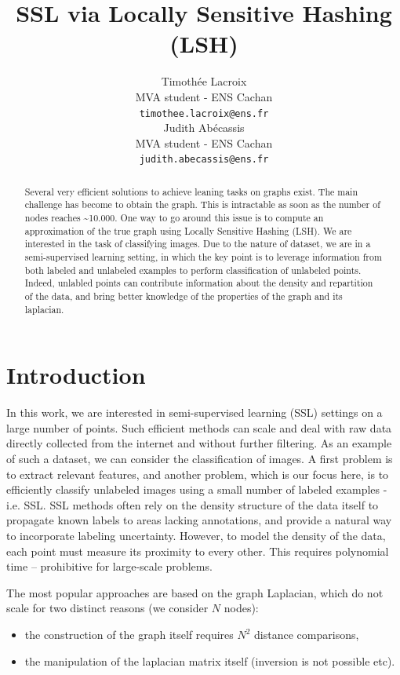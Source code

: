 \documentclass{article} %
\title{SSL via Locally Sensitive Hashing (LSH)}
\author{
Timothée Lacroix \\
MVA student - ENS Cachan\\
\texttt{timothee.lacroix@ens.fr} \\
\And
Judith Abécassis \\
MVA student - ENS Cachan \\
\texttt{judith.abecassis@ens.fr} \\
}
\begin{document}
\maketitle

\begin{abstract}
Several very efficient solutions to achieve leaning tasks on graphs exist. The main challenge has become to obtain the graph. This is intractable as soon as the number of nodes reaches \textasciitilde 10.000. One way to go around this issue is to compute an approximation of the true graph using Locally Sensitive Hashing (LSH). We are interested in the task of classifying images. Due to the nature of dataset, we are in a semi-supervised learning setting, in which the key point is to leverage information from both labeled and unlabeled examples to perform classification of unlabeled points. Indeed, unlabled points can contribute information about the density and repartition of the data, and bring better knowledge of the properties of the graph and its laplacian.
\end{abstract}


\section{Introduction}
In this work, we are interested in semi-supervised learning (SSL) settings on a large number of points. Such efficient methods can scale and deal with raw data directly collected from the internet and without further filtering. As an example of such a dataset, we can consider the classification of images. A first problem is to extract relevant features, and another problem, which is our focus here, is to efficiently classify unlabeled images using a small number of labeled examples - i.e. SSL. SSL methods often rely on the density structure of the data itself to propagate known labels to areas lacking annotations, and provide a natural way to incorporate labeling uncertainty. However, to model the density of the data, each point must measure its proximity to every other. This requires polynomial time – prohibitive for large-scale problems. 

 The most popular approaches are based on the graph Laplacian, which do not scale for two distinct reasons (we consider $N$ nodes):
\begin{itemize}
\item the construction of the graph itself requires $N^2$ distance comparisons,
\item the manipulation of the laplacian matrix itself (inversion is not possible etc).
\end{itemize}
\end{document}
